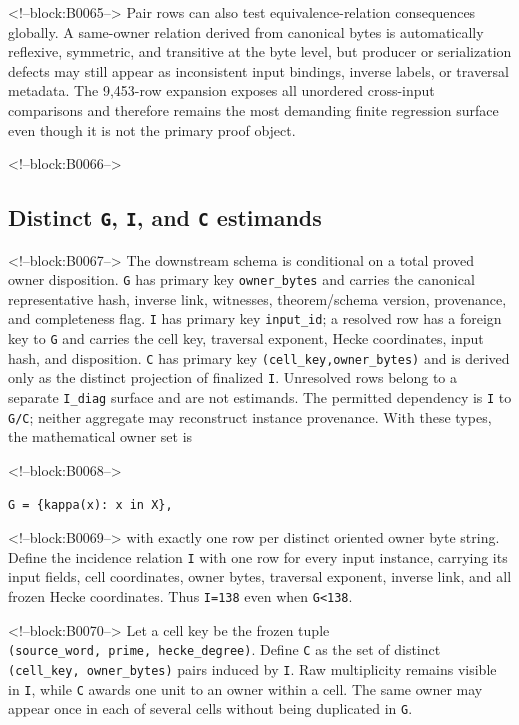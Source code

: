 \documentclass[11pt]{article}
\begin{document}
<!--block:B0065-->
Pair rows can also test equivalence-relation consequences globally. A
same-owner relation derived from canonical bytes is automatically
reflexive, symmetric, and transitive at the byte level, but producer or
serialization defects may still appear as inconsistent input bindings,
inverse labels, or traversal metadata. The 9,453-row expansion exposes
all unordered cross-input comparisons and therefore remains the most
demanding finite regression surface even though it is not the primary
proof object.

<!--block:B0066-->
\hypertarget{44-distinct-g-i-and-c-estimands}{%
\subsection{\texorpdfstring{Distinct \texttt{G}, \texttt{I}, and
\texttt{C}
estimands}{Distinct G, I, and C estimands}}\label{44-distinct-g-i-and-c-estimands}}

<!--block:B0067-->
The downstream schema is conditional on a total proved owner disposition.
\texttt{G} has primary key \texttt{owner\_bytes} and carries the canonical
representative hash, inverse link, witnesses, theorem/schema version,
provenance, and completeness flag. \texttt{I} has primary key
\texttt{input\_id}; a resolved row has a foreign key to \texttt{G} and carries
the cell key, traversal exponent, Hecke coordinates, input hash, and
disposition. \texttt{C} has primary key
\texttt{(cell\_key,owner\_bytes)} and is derived only as the distinct
projection of finalized \texttt{I}. Unresolved rows belong to a separate
\texttt{I\_diag} surface and are not estimands. The permitted dependency is
\texttt{I} to \texttt{G/C}; neither aggregate may reconstruct instance
provenance. With these types, the mathematical owner set is

<!--block:B0068-->
\begin{verbatim}
G = {kappa(x): x in X},
\end{verbatim}

<!--block:B0069-->
with exactly one row per distinct oriented owner byte string. Define the
incidence relation \texttt{I} with one row for every input instance,
carrying its input fields, cell coordinates, owner bytes, traversal
exponent, inverse link, and all frozen Hecke coordinates. Thus
\texttt{\textbar{}I\textbar{}=138} even when
\texttt{\textbar{}G\textbar{}\textless{}138}.

<!--block:B0070-->
Let a cell key be the frozen tuple
\texttt{(source\_word,\ prime,\ hecke\_degree)}. Define \texttt{C} as
the set of distinct \texttt{(cell\_key,\ owner\_bytes)} pairs induced by
\texttt{I}. Raw multiplicity remains visible in \texttt{I}, while
\texttt{C} awards one unit to an owner within a cell. The same owner may
appear once in each of several cells without being duplicated in
\texttt{G}.
\end{document}
